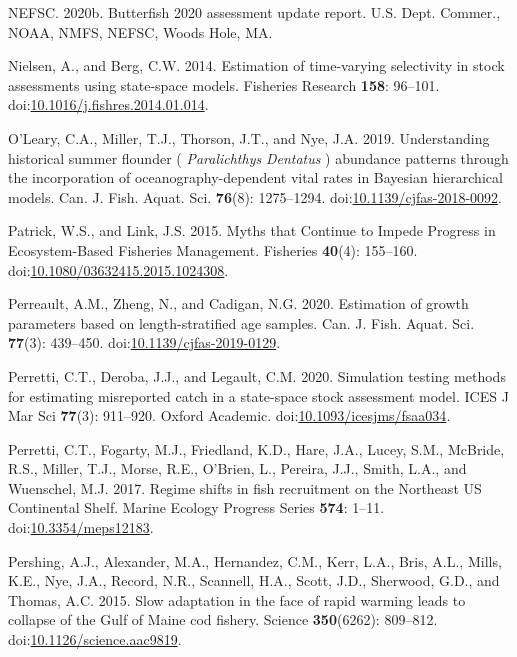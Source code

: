 \documentclass[]{article}
\begin{document}
\leavevmode\hypertarget{ref-nefsc2020Butterfish}{}%
NEFSC. 2020b. Butterfish 2020 assessment update report. U.S. Dept.
Commer., NOAA, NMFS, NEFSC, Woods Hole, MA.

\leavevmode\hypertarget{ref-nielsen2014Estimation}{}%
Nielsen, A., and Berg, C.W. 2014. Estimation of time-varying selectivity
in stock assessments using state-space models. Fisheries Research
\textbf{158}: 96--101.
doi:\href{https://doi.org/10.1016/j.fishres.2014.01.014}{10.1016/j.fishres.2014.01.014}.

\leavevmode\hypertarget{ref-oleary2019Understanding}{}%
O'Leary, C.A., Miller, T.J., Thorson, J.T., and Nye, J.A. 2019.
Understanding historical summer flounder ( \emph{Paralichthys}
\emph{Dentatus} ) abundance patterns through the incorporation of
oceanography-dependent vital rates in Bayesian hierarchical models. Can.
J. Fish. Aquat. Sci. \textbf{76}(8): 1275--1294.
doi:\href{https://doi.org/10.1139/cjfas-2018-0092}{10.1139/cjfas-2018-0092}.

\leavevmode\hypertarget{ref-patrick2015Myths}{}%
Patrick, W.S., and Link, J.S. 2015. Myths that Continue to Impede
Progress in Ecosystem-Based Fisheries Management. Fisheries
\textbf{40}(4): 155--160.
doi:\href{https://doi.org/10.1080/03632415.2015.1024308}{10.1080/03632415.2015.1024308}.

\leavevmode\hypertarget{ref-perreault2020Estimation}{}%
Perreault, A.M., Zheng, N., and Cadigan, N.G. 2020. Estimation of growth
parameters based on length-stratified age samples. Can. J. Fish. Aquat.
Sci. \textbf{77}(3): 439--450.
doi:\href{https://doi.org/10.1139/cjfas-2019-0129}{10.1139/cjfas-2019-0129}.

\leavevmode\hypertarget{ref-perretti2020Simulation}{}%
Perretti, C.T., Deroba, J.J., and Legault, C.M. 2020. Simulation testing
methods for estimating misreported catch in a state-space stock
assessment model. ICES J Mar Sci \textbf{77}(3): 911--920. Oxford
Academic.
doi:\href{https://doi.org/10.1093/icesjms/fsaa034}{10.1093/icesjms/fsaa034}.

\leavevmode\hypertarget{ref-perretti2017Regime}{}%
Perretti, C.T., Fogarty, M.J., Friedland, K.D., Hare, J.A., Lucey, S.M.,
McBride, R.S., Miller, T.J., Morse, R.E., O'Brien, L., Pereira, J.J.,
Smith, L.A., and Wuenschel, M.J. 2017. Regime shifts in fish recruitment
on the Northeast US Continental Shelf. Marine Ecology Progress Series
\textbf{574}: 1--11.
doi:\href{https://doi.org/10.3354/meps12183}{10.3354/meps12183}.

\leavevmode\hypertarget{ref-pershing2015Slow}{}%
Pershing, A.J., Alexander, M.A., Hernandez, C.M., Kerr, L.A., Bris,
A.L., Mills, K.E., Nye, J.A., Record, N.R., Scannell, H.A., Scott, J.D.,
Sherwood, G.D., and Thomas, A.C. 2015. Slow adaptation in the face of
rapid warming leads to collapse of the Gulf of Maine cod fishery.
Science \textbf{350}(6262): 809--812.
doi:\href{https://doi.org/10.1126/science.aac9819}{10.1126/science.aac9819}.
\end{document}
